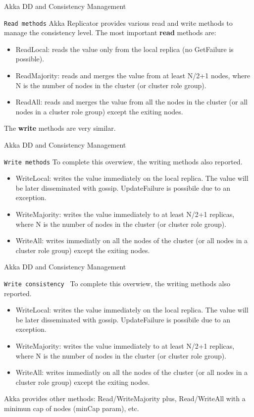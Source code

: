 \documentclass[presentation,apice]{beamer}\mode<presentation>{\usetheme{AMSBolognaFC}}
\begin{document}
\begin{frame}[c,fragile]{Akka DD and Consistency Management}
\begin{block}{\texttt{Read methods}}
Akka Replicator provides various read and write methods to manage the consistency level. The most important \textbf{read} methods are:
\begin{itemize}
    \item ReadLocal: reads the value only from the local replica (no GetFailure is possible).
    \item ReadMajority: reads and merges the value from at least N/2+1 nodes, where N is the number of nodes in the cluster (or cluster role group).
    \item ReadAll: reads and merges the value from all the nodes in the cluster (or all nodes in a cluster role group) except the exiting nodes.
\end{itemize}
The \textbf{write} methods are very similar. 
\end{block}
\end{frame}

\begin{frame}[c,fragile]{Akka DD and Consistency Management}
\begin{block}{\texttt{Write methods}}
To complete this overwiew, the writing methods also reported.
\begin{itemize}
    \item WriteLocal: writes the value immediately on the local replica. The value will be later disseminated with gossip. UpdateFailure is possibile due to an exception.
    \item WriteMajority: writes the value immediately to at least N/2+1 replicas, where N is the number of nodes in the cluster (or cluster role group).
    \item WriteAll: writes immediatly on all the nodes of the cluster (or all nodes in a cluster role group) except the exiting nodes.
\end{itemize}
\end{block}
\end{frame}

\begin{frame}[c,fragile]{Akka DD and Consistency Management}
\begin{block}{\texttt{Write consistency }}
To complete this overwiew, the writing methods also reported.
\begin{itemize}
    \item WriteLocal: writes the value immediately on the local replica. The value will be later disseminated with gossip. UpdateFailure is possibile due to an exception.
    \item WriteMajority: writes the value immediately to at least N/2+1 replicas, where N is the number of nodes in the cluster (or cluster role group).
    \item WriteAll: writes immediatly on all the nodes of the cluster (or all nodes in a cluster role group) except the exiting nodes.
\end{itemize}
\end{block}
Akka provides other methods: Read/WriteMajority plus, Read/WriteAll with a minimun cap of nodes (minCap param), etc.
\end{frame}
\end{document}
